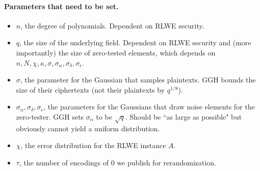 \paragraph{Parameters that need to be set.}

\begin{itemize}
\item $n$, the degree of polynomials.  Dependent on RLWE security.
\item $q$, the size of the underlying field.  Dependent on RLWE security and (more importantly) the size of zero-tested elements, which depends on $n, N, \chi, \kappa, \sigma, \sigma_\alpha, \sigma_\delta, \sigma_\epsilon$.
\item $\sigma$, the parameter for the Gaussian that samples plaintexts.  GGH bounds the size of their ciphertexts (not their plaintexts by $q^{1/8}$).
\item $\sigma_\alpha, \sigma_\delta, \sigma_\epsilon$, the parameters for the Gaussians that draw noise elements for the zero-tester.  GGH sets $\sigma_\alpha$ to be $\sqrt{q}$.  Should be ``as large as possible" but obviously cannot yield a uniform distribution.
\item $\chi$, the error distribution for the RLWE instance $A$.
\item $\tau$, the number of encodings of $0$ we publish for rerandomization.
\end{itemize}


